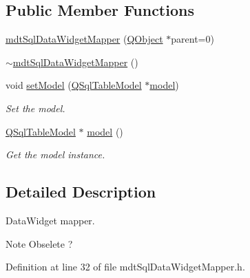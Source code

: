 \subsection*{Public Member Functions}
\begin{DoxyCompactItemize}
\item 
\hyperlink{classmdt_sql_data_widget_mapper_a526266b947f0a787e28b48976bfe3d91}{mdt\-Sql\-Data\-Widget\-Mapper} (\hyperlink{class_q_object}{Q\-Object} $\ast$parent=0)
\item 
\hyperlink{classmdt_sql_data_widget_mapper_a0de27996243693391034fc5833b3a1ad}{$\sim$mdt\-Sql\-Data\-Widget\-Mapper} ()
\item 
void \hyperlink{classmdt_sql_data_widget_mapper_ae32a335edcb2bb37bf86f1f59874a1f4}{set\-Model} (\hyperlink{class_q_sql_table_model}{Q\-Sql\-Table\-Model} $\ast$\hyperlink{classmdt_sql_data_widget_mapper_adc6e8948ea3c0e81a35955b516770734}{model})
\begin{DoxyCompactList}\small\item\em Set the model. \end{DoxyCompactList}\item 
\hyperlink{class_q_sql_table_model}{Q\-Sql\-Table\-Model} $\ast$ \hyperlink{classmdt_sql_data_widget_mapper_adc6e8948ea3c0e81a35955b516770734}{model} ()
\begin{DoxyCompactList}\small\item\em Get the model instance. \end{DoxyCompactList}\end{DoxyCompactItemize}


\subsection{Detailed Description}
Data\-Widget mapper. 

\begin{DoxyNote}{Note}
Obselete ? 
\end{DoxyNote}


Definition at line 32 of file mdt\-Sql\-Data\-Widget\-Mapper.\-h.



